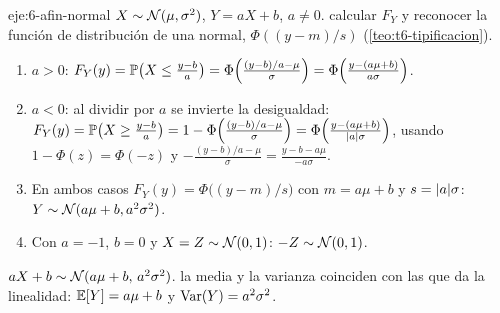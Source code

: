 \begin{solucion}{eje:6-afin-normal}
\datos $X\sim\mathcal{N}(\mu,\sigma^{2})$, $Y=aX+b$, $a\neq0$.
\planteamiento calcular $F_Y$ y reconocer la función de distribución de una normal, $\Phi((y-m)/s)$ (\cref{teo:t6-tipificacion}).
\pasos
\begin{enumerate}[label=\arabic*.]
  \item $a>0$: $F_Y(y)=\mathbb{P}\bigl(X\le\frac{y-b}a\bigr)=\Phi\Bigl(\frac{(y-b)/a-\mu}{\sigma}\Bigr)=\Phi\Bigl(\frac{y-(a\mu+b)}{a\sigma}\Bigr)$.
  \item $a<0$: al dividir por $a$ se invierte la desigualdad: $F_Y(y)=\mathbb{P}\bigl(X\ge\frac{y-b}a\bigr)=1-\Phi\Bigl(\frac{(y-b)/a-\mu}\sigma\Bigr)=\Phi\Bigl(\frac{y-(a\mu+b)}{\lvert a\rvert\sigma}\Bigr)$, usando $1-\Phi(z)=\Phi(-z)$ y $-\frac{(y-b)/a-\mu}{\sigma}=\frac{y-b-a\mu}{-a\sigma}$.
  \item En ambos casos $F_Y(y)=\Phi\bigl((y-m)/s\bigr)$ con $m=a\mu+b$ y $s=\lvert a\rvert\sigma$: $Y\sim\mathcal{N}(a\mu+b,a^{2}\sigma^{2})$.
  \item Con $a=-1$, $b=0$ y $X=Z\sim\mathcal{N}(0,1)$: $-Z\sim\mathcal{N}(0,1)$.
\end{enumerate}
\resultado $aX+b\sim\mathcal{N}(a\mu+b,\,a^{2}\sigma^{2})$.
\comprobacion la media y la varianza coinciden con las que da la linealidad: $\mathbb{E}[Y]=a\mu+b$ y $\operatorname{Var}(Y)=a^{2}\sigma^{2}$.
\end{solucion}
